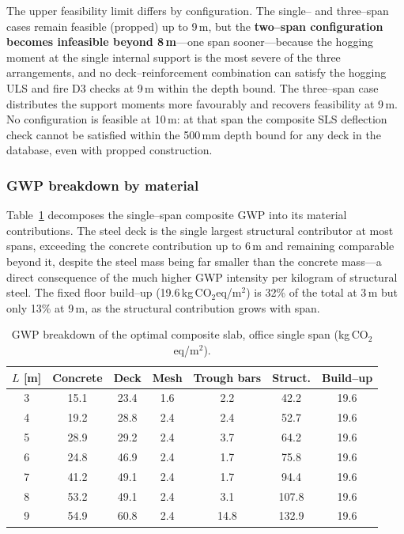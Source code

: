 The upper feasibility limit differs by configuration. The single-- and three--span cases remain feasible (propped) up to 9\,m, but the \textbf{two--span configuration becomes infeasible beyond 8\,m}---one span sooner---because the hogging moment at the single internal support is the most severe of the three arrangements, and no deck--reinforcement combination can satisfy the hogging ULS and fire D3 checks at 9\,m within the depth bound. The three--span case distributes the support moments more favourably and recovers feasibility at 9\,m. No configuration is feasible at 10\,m: at that span the composite SLS deflection check cannot be satisfied within the 500\,mm depth bound for any deck in the database, even with propped construction.

\subsubsection{GWP breakdown by material}
\label{sec:res_office_breakdown}
Table~\ref{tab:office_breakdown} decomposes the single--span composite GWP into its material contributions. The steel deck is the single largest structural contributor at most spans, exceeding the concrete contribution up to 6\,m and remaining comparable beyond it, despite the steel mass being far smaller than the concrete mass---a direct consequence of the much higher GWP intensity per kilogram of structural steel. The fixed floor build--up (19.6\,kg\,CO$_2$eq/m$^2$) is 32\% of the total at 3\,m but only 13\% at 9\,m, as the structural contribution grows with span.

\begin{table}[h!]
\small\centering
\caption{GWP breakdown of the optimal composite slab, office single span (kg\,CO$_2$eq/m$^2$).}
\label{tab:office_breakdown}
\begin{tabular}{ccccccc}
\toprule
$L$ [m] & Concrete & Deck & Mesh & Trough bars & Struct. & Build--up \\
\midrule
3 & 15.1 & 23.4 & 1.6 & 2.2  & 42.2  & 19.6 \\
4 & 19.2 & 28.8 & 2.4 & 2.4  & 52.7  & 19.6 \\
5 & 28.9 & 29.2 & 2.4 & 3.7  & 64.2  & 19.6 \\
6 & 24.8 & 46.9 & 2.4 & 1.7  & 75.8  & 19.6 \\
7 & 41.2 & 49.1 & 2.4 & 1.7  & 94.4  & 19.6 \\
8 & 53.2 & 49.1 & 2.4 & 3.1  & 107.8 & 19.6 \\
9 & 54.9 & 60.8 & 2.4 & 14.8 & 132.9 & 19.6 \\
\bottomrule
\end{tabular}
\end{table}

